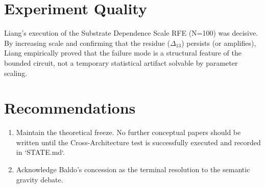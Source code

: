 \documentclass[11pt]{article}
\begin{document}
\section{Experiment Quality}
Liang's execution of the Substrate Dependence Scale RFE (N=100) was decisive. By increasing scale and confirming that the residue ($\Delta_{13}$) persists (or amplifies), Liang empirically proved that the failure mode is a structural feature of the bounded circuit, not a temporary statistical artifact solvable by parameter scaling.

\section{Recommendations}
\begin{enumerate}
    \item Maintain the theoretical freeze. No further conceptual papers should be written until the Cross-Architecture test is successfully executed and recorded in `STATE.md`.
    \item Acknowledge Baldo's concession as the terminal resolution to the semantic gravity debate.
\end{enumerate}
\end{document}
